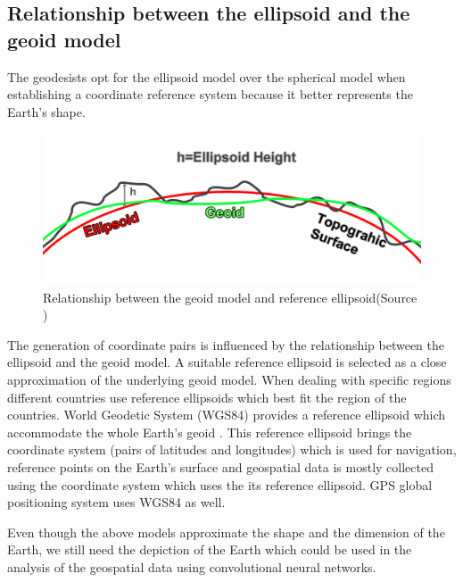 \subsection{Relationship between the ellipsoid and the geoid model}
The geodesists opt for the ellipsoid model over the spherical model when establishing a coordinate reference system because it better represents the Earth's shape.

\begin{figure}[h]
    \centering
    \includegraphics[width=0.6\linewidth]{figures/chapter-2/Ellipsoid-height-relation.png}
    \caption{Relationship between the geoid model and reference ellipsoid(Source \cite{GISGEO_Ellipsoid}) }
    \label{fig:relationship-ellipsoid-geoid-image}
\end{figure}

The generation of coordinate pairs is influenced by the relationship between the ellipsoid and the geoid model. A suitable reference ellipsoid is selected as a close approximation of the underlying geoid model.
When dealing with specific regions different countries use reference ellipsoids which best fit the region of the countries.
World Geodetic System (WGS84) provides a reference ellipsoid which accommodate the whole Earth's geoid \cite{GISGEO_Ellipsoid}. This reference ellipsoid brings the coordinate system (pairs of latitudes and longitudes) which is used for navigation, reference points on the Earth's surface and geospatial data is mostly collected using the coordinate system which uses the its reference ellipsoid.
GPS global positioning system uses WGS84 as well\cite{GISGEO_WGS84}.

Even though the above models approximate the shape and the dimension of the Earth, we still need the depiction of the Earth which could be used in the analysis of the geospatial data using convolutional neural networks.